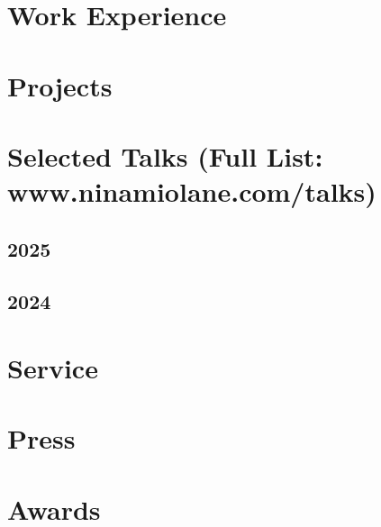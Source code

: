 \documentclass[a4paper,12pt]{article}
\begin{document}
\section{Work Experience}


\section{Projects}


\section{Selected Talks (Full List: www.ninamiolane.com/talks)}

\subsection*{2025}
\subsection*{2024}

\section{Service}

\section{Press}

\section{Awards}







\vfill
{}
\end{document}
